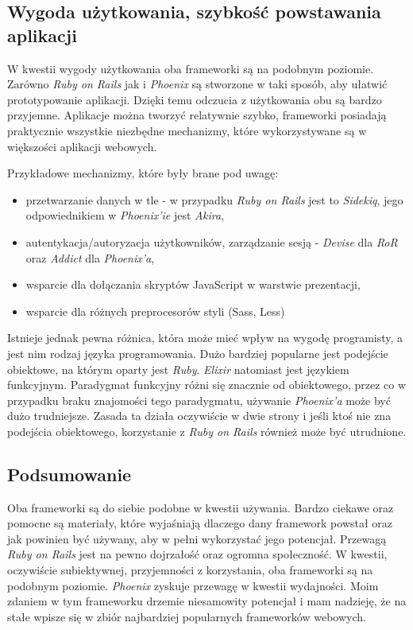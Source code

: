 \subsection{Wygoda użytkowania, szybkość powstawania aplikacji}
W kwestii wygody użytkowania oba frameworki są na podobnym poziomie. Zarówno \textit{Ruby on Rails} jak i \textit{Phoenix} są stworzone w taki sposób, aby ułatwić prototypowanie aplikacji. Dzięki temu odczucia z użytkowania obu są bardzo przyjemne. Aplikacje można tworzyć relatywnie szybko, frameworki posiadają praktycznie wszystkie niezbędne mechanizmy, które wykorzystywane są w większości aplikacji webowych.

Przykładowe mechanizmy, które były brane pod uwagę:
\begin{itemize}
  \item przetwarzanie danych w tle - w przypadku \textit{Ruby on Rails} jest to \textit{Sidekiq}, jego odpowiednikiem w \textit{Phoenix'ie} jest \textit{Akira},
  \item autentykacja/autoryzacja użytkowników, zarządzanie sesją - \textit{Devise} dla \textit{RoR} oraz \textit{Addict} dla \textit{Phoenix'a},
  \item wsparcie dla dołączania skryptów JavaScript w warstwie prezentacji,
  \item wsparcie dla różnych preprocesorów styli (Sass, Less)
\end{itemize}

Istnieje jednak pewna różnica, która może mieć wpływ na wygodę programisty, a jest nim rodzaj języka programowania. Dużo bardziej popularne jest podejście obiektowe, na którym oparty jest \textit{Ruby}. \textit{Elixir} natomiast jest językiem funkcyjnym. Paradygmat funkcyjny różni się znacznie od obiektowego, przez co w przypadku braku znajomości tego paradygmatu, używanie \textit{Phoenix'a} może być dużo trudniejsze. Zasada ta działa oczywiście w dwie strony i jeśli ktoś nie zna podejścia obiektowego, korzystanie z \textit{Ruby on Rails} również może być utrudnione.

\subsection{Podsumowanie}
Oba frameworki są do siebie podobne w kwestii używania. Bardzo ciekawe oraz pomocne są materiały, które wyjaśniają dlaczego dany framework powstał oraz jak powinien być używany, aby w pełni wykorzystać jego potencjał. Przewagą \textit{Ruby on Rails} jest na pewno dojrzałość oraz ogromna społeczność. W kwestii, oczywiście subiektywnej, przyjemności z korzystania, oba frameworki są na podobnym poziomie. \textit{Phoenix} zyskuje przewagę w kwestii wydajności. Moim zdaniem w tym frameworku drzemie niesamowity potencjał i mam nadzieję, że na stałe wpisze się w zbiór najbardziej popularnych frameworków webowych.


